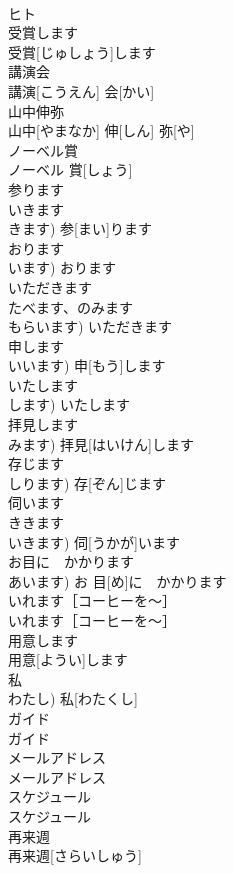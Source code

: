 \documentclass[8pt]{extreport}
\begin{document}
\begin{CJK}{UTF8}{min}
\\	ヒト	
\\	受賞します	
\\	受賞[じゅしょう]します	
\\	講演会	
\\	講演[こうえん] 会[かい]	
\\	山中伸弥	
\\	山中[やまなか] 伸[しん] 弥[や]	
\\	ノーベル賞	
\\	ノーベル 賞[しょう]	
\\	参ります	
\\	いきます 
\\	きます)	参[まい]ります	
\\	おります	
\\	います)	おります	
\\	いただきます	
\\	たべます、のみます 
\\	もらいます)	いただきます	
\\	申します	
\\	いいます)	申[もう]します	
\\	いたします	
\\	します)	いたします	
\\	拝見します	
\\	みます)	拝見[はいけん]します	
\\	存じます	
\\	しります)	存[ぞん]じます	
\\	伺います	
\\	ききます 
\\	いきます)	伺[うかが]います	
\\	お目に　かかります	
\\	あいます)	お 目[め]に　かかります	
\\	いれます［コーヒーを〜］	
\\	いれます［コーヒーを〜］	
\\	用意します	
\\	用意[ようい]します	
\\	私	
\\	わたし)	私[わたくし]	
\\	ガイド	
\\	ガイド	
\\	メールアドレス	
\\	メールアドレス	
\\	スケジュール	
\\	スケジュール	
\\	再来週	
\\	再来週[さらいしゅう]	

\end{CJK}
\end{document}
